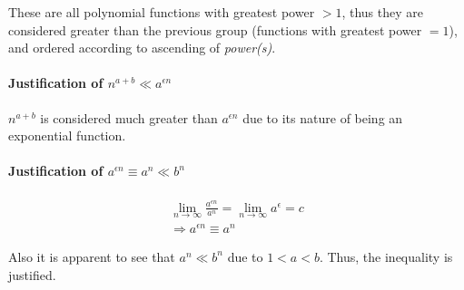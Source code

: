 \documentclass[12pt]{article}
\begin{document}
These are all polynomial functions with greatest power $> 1$, thus they are considered greater than the previous group (functions with greatest power $= 1$), and ordered according to ascending of \textit{power(s)}.



\paragraph{Justification of $n^{a+b} \ll a^{\epsilon n} $\newline}

$n^{a+b}$ is considered much greater than $a^{\epsilon n}$ due to its nature of being an exponential function.

\paragraph{Justification of $a^{\epsilon n} \equiv a^n \ll b^n$\newline}


\begin{gather}
    \lim\limits_{n \to \infty} \frac{a^{\epsilon n}}{a^n} = \lim\limits_{n \to \infty} a^{\epsilon} = c \nonumber \\
    \Rightarrow a^{\epsilon n} \equiv a^n
\end{gather}

Also it is apparent to see that $a^n \ll b^n$ due to $1 < a < b$. Thus, the inequality is justified.

%
% 
% 
\end{document}
